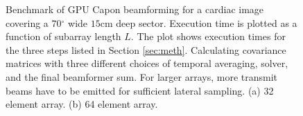 \documentclass[12pt,journal,onecolumn]{IEEEtran}
\newcommand{\degree}{\ensuremath{^\circ}}
\begin{document}
\begin{figure}[!t]
\centerline{
\hfil
{}}
\caption{Benchmark of GPU Capon beamforming for a cardiac image covering a $70\degree$ wide $15$cm deep sector. Execution time is plotted as a function of subarray length $L$. The plot shows execution times for the three steps listed in Section \ref{sec:meth}. Calculating covariance matrices with three different choices of temporal averaging, solver, and the final beamformer sum. For larger arrays, more transmit beams have to be emitted for sufficient lateral sampling. (a)  32 element array. (b)  64 element array.}
\label{fig:bench}
\end{figure}
\end{document}
